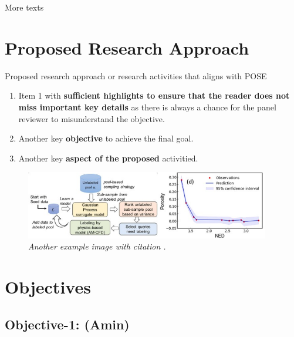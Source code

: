 \documentclass[11pt]{article}
\begin{document}
More texts

\section{Proposed Research Approach}
Proposed research approach or research activities that aligns with POSE

\vspace{-10pt}
\begin{enumerate}[label=\textbf{Objective-\arabic*:}, align=left, labelwidth=4em, labelsep=1em, leftmargin=*,noitemsep]
    \item Item 1 with \textbf{sufficient highlights to ensure that the reader does not miss important key details} as there is always a chance for the panel reviewer to misunderstand the objective.
    \item Another key \textbf{objective} to achieve the final goal.
    \item Another key \textbf{aspect of the proposed} activitied.
\end{enumerate}

\begin{figure}[htbp]
	\centering
	\includegraphics[width=0.95\textwidth]{./figures/ActiveLearning.png} %
    \vspace{-13pt}  %
    \caption{\emph{Another example image with citation \cite{mojumderLinkingProcessParameters2023}.}}
	\label{fig:active-learning}
    \vspace{-20pt}  %
\end{figure}
%
\section{Objectives}
\label{sec:objectives}
\subsection{Objective-1: (Amin)}
\label{sec:object1}
\end{document}

